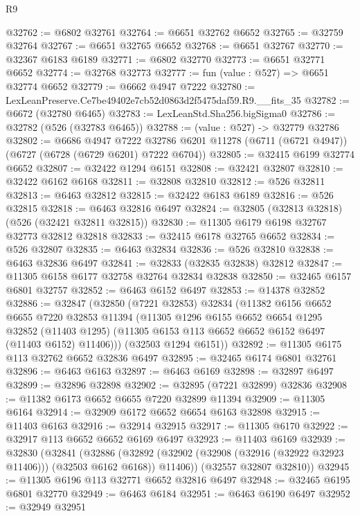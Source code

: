 \begin{lexlean}{R9}
\begin{coremodule}
@32762 := @6802 @32761
@32764 := @6651 @32762 @6652
@32765 := @32759 @32764
@32767 := @6651 @32765 @6652
@32768 := @6651 @32767
@32770 := @32367 @6183 @6189
@32771 := @6802 @32770
@32773 := @6651 @32771 @6652
@32774 := @32768 @32773
@32777 := fun (value : @527) => @6651 @32774 @6652
@32779 := @6662 @4947 @7222
@32780 := LexLeanPreserve.Ce7be49402e7cb52d0863d2f5475daf59.R9.__fits_35
@32782 := @6672 (@32780 @6465)
@32783 := LexLeanStd.Sha256.bigSigma0
@32786 := @32782 (@526 (@32783 @6465))
@32788 := (value : @527) -> @32779 @32786
@32802 := @6686
    @4947
    @7222
    @32786
    @6201
    @11278
    (@6711 (@6721 @4947))
    (@6727 (@6728 (@6729 @6201) @7222 @6704))
@32805 := @32415 @6199 @32774 @6652
@32807 := @32422 @1294 @6151
@32808 := @32421 @32807
@32810 := @32422 @6162 @6168
@32811 := @32808 @32810
@32812 := @526 @32811
@32813 := @6463 @32812
@32815 := @32422 @6183 @6189
@32816 := @526 @32815
@32818 := @6463 @32816 @6497
@32824 := @32805 (@32813 @32818) (@526 (@32421 @32811 @32815))
@32830 := @11305 @6179 @6198 @32767 @32773 @32812 @32818
@32833 := @32415 @6178 @32765 @6652
@32834 := @526 @32807
@32835 := @6463 @32834
@32836 := @526 @32810
@32838 := @6463 @32836 @6497
@32841 := @32833 (@32835 @32838) @32812
@32847 := @11305 @6158 @6177 @32758 @32764 @32834 @32838
@32850 := @32465 @6157 @6801 @32757
@32852 := @6463 @6152 @6497
@32853 := @14378 @32852
@32886 := @32847
    (@32850
      (@7221 @32853)
      @32834
      (@11382
        @6156
        @6652
        @6655
        @7220
        @32853
        @11394
        (@11305
          @1296
          @6155
          @6652
          @6654
          @1295
          @32852
          (@11403 @1295)
          (@11305 @6153 @113 @6652 @6652 @6152 @6497 (@11403 @6152) @11406)))
      (@32503 @1294 @6151))
@32892 := @11305 @6175 @113 @32762 @6652 @32836 @6497
@32895 := @32465 @6174 @6801 @32761
@32896 := @6463 @6163
@32897 := @6463 @6169
@32898 := @32897 @6497
@32899 := @32896 @32898
@32902 := @32895 (@7221 @32899) @32836
@32908 := @11382 @6173 @6652 @6655 @7220 @32899 @11394
@32909 := @11305 @6164
@32914 := @32909 @6172 @6652 @6654 @6163 @32898
@32915 := @11403 @6163
@32916 := @32914 @32915
@32917 := @11305 @6170
@32922 := @32917 @113 @6652 @6652 @6169 @6497
@32923 := @11403 @6169
@32939 := @32830
    (@32841
      (@32886
        (@32892 (@32902 (@32908 (@32916 (@32922 @32923 @11406))) (@32503 @6162 @6168)) @11406))
      (@32557 @32807 @32810))
@32945 := @11305 @6196 @113 @32771 @6652 @32816 @6497
@32948 := @32465 @6195 @6801 @32770
@32949 := @6463 @6184
@32951 := @6463 @6190 @6497
@32952 := @32949 @32951

\end{coremodule}
\end{lexlean}
